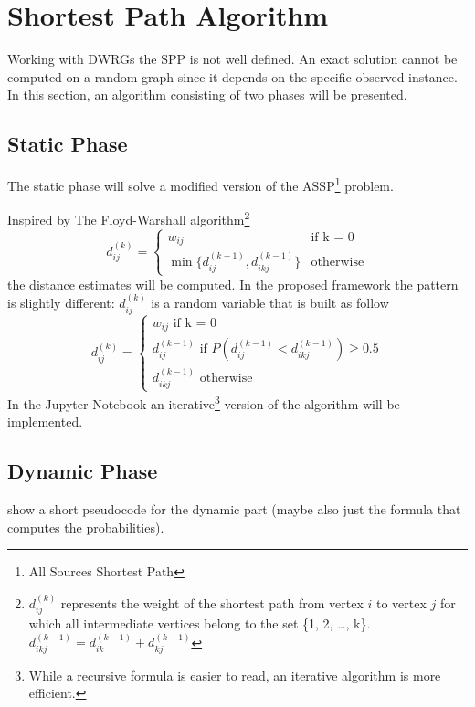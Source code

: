 \section{Shortest Path Algorithm}

Working with DWRGs the SPP is not well defined.
An exact solution cannot be computed on a random graph since it depends on the specific observed instance.
In this section, an algorithm consisting of two phases will be presented.

\subsection{Static Phase}

The static phase will solve a modified version of the ASSP\footnote{All Sources Shortest Path} problem.

Inspired by The Floyd-Warshall\cite{cormen2010introduction} algorithm\footnote{$d_{ij}^{(k)}$ represents the weight of the shortest path from vertex $i$ to vertex $j$ for which all intermediate vertices belong to the set \{1, 2, \dots, k\}. $d_{ikj}^{(k-1)} = d_{ik}^{(k-1)} + d_{kj}^{(k-1)}$}
\begin{equation*}
	d_{ij}^{(k)} = 
	\begin{cases}
		w_{ij} & \text{if k = 0} \\
		\min\{d_{ij}^{(k-1)}, d_{ikj}^{(k-1)}\} & \text{otherwise}
	\end{cases}
\end{equation*}
the distance estimates will be computed.
In the proposed framework the pattern is slightly different: $d_{ij}^{(k)}$ is a random variable that is built as follow
\begin{equation*}
	d_{ij}^{(k)} = 
	\begin{cases}
		w_{ij} \text{ \ \ \ if k = 0} \\
		d_{ij}^{(k-1)} \text{ if } P(d_{ij}^{(k-1)} < d_{ikj}^{(k-1)}) \geq 0.5 \\
		d_{ikj}^{(k-1)} \text{ otherwise}
	\end{cases}
\end{equation*}
In the Jupyter Notebook an iterative\footnote{While a recursive formula is easier to read, an iterative algorithm is more efficient.} version of the algorithm will be implemented.
\subsection{Dynamic Phase}
show a short pseudocode for the dynamic part (maybe also just the formula that computes the probabilities).